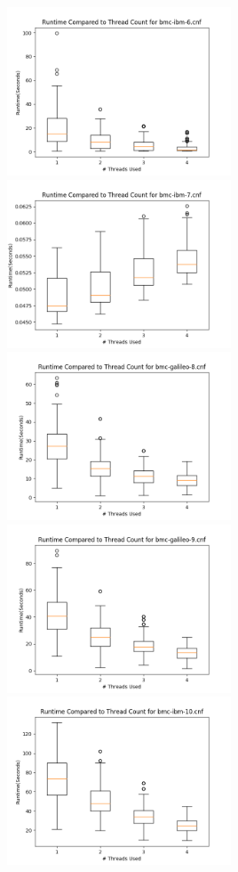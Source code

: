 \documentclass[11pt]{extarticle}
\begin{document}
\includegraphics[width=0.5\textwidth]{figures/bmc-ibm-6.png}
\includegraphics[width=0.5\textwidth]{figures/bmc-ibm-7.png}
\includegraphics[width=0.5\textwidth]{figures/bmc-galileo-8.png}
\includegraphics[width=0.5\textwidth]{figures/bmc-galileo-9.png}
\includegraphics[width=0.5\textwidth]{figures/bmc-ibm-10.png}
\end{document}
